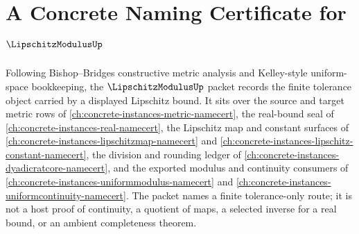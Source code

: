 \chapter{A Concrete Naming Certificate for $\LipschitzModulusUp$}
\label{ch:concrete-instances-lipschitz-modulus-namecert}

Following Bishop--Bridges constructive metric analysis and Kelley-style uniform-space bookkeeping, the $\LipschitzModulusUp$ packet records the finite tolerance object carried by a displayed Lipschitz bound. It sits over the source and target metric rows of \autoref{ch:concrete-instances-metric-namecert}, the real-bound seal of \autoref{ch:concrete-instances-real-namecert}, the Lipschitz map and constant surfaces of \autoref{ch:concrete-instances-lipschitzmap-namecert} and \autoref{ch:concrete-instances-lipschitz-constant-namecert}, the division and rounding ledger of \autoref{ch:concrete-instances-dyadicratcore-namecert}, and the exported modulus and continuity consumers of \autoref{ch:concrete-instances-uniformmodulus-namecert} and \autoref{ch:concrete-instances-uniformcontinuity-namecert}. The packet names a finite tolerance-only route; it is not a host proof of continuity, a quotient of maps, a selected inverse for a real bound, or an ambient completeness theorem.

